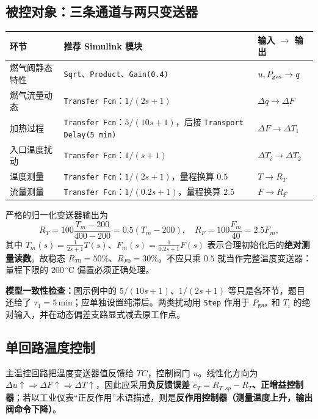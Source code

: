 \documentclass[UTF8,a4paper,11pt]{ctexart}
\newcommand{\dev}{\Delta}
\newcommand{\unit}[1]{\,\mathrm{#1}}
\begin{document}
\subsection{被控对象：三条通道与两只变送器}
\begin{center}
\small
\begin{tabular}{p{.26\linewidth}p{.38\linewidth}p{.26\linewidth}}
\toprule
环节 & 推荐 Simulink 模块 & 输入 $\rightarrow$ 输出\\
\midrule
燃气阀静态特性 & \texttt{Sqrt}、\texttt{Product}、\texttt{Gain(0.4)} & $u,P_{\rm gas}\rightarrow q$\\
燃气流量动态 & \texttt{Transfer Fcn}：$1/(2s+1)$ & $\dev q\rightarrow\dev F$\\
加热过程 & \texttt{Transfer Fcn}：$5/(10s+1)$，后接 \texttt{Transport Delay(5 min)} & $\dev F\rightarrow\dev T_1$\\
入口温度扰动 & \texttt{Transfer Fcn}：$1/(s+1)$ & $\dev T_i\rightarrow\dev T_2$\\
温度测量 & \texttt{Transfer Fcn}：$1/(2s+1)$，量程换算 $0.5$ & $T\rightarrow R_T$\\
流量测量 & \texttt{Transfer Fcn}：$1/(0.2s+1)$，量程换算 $2.5$ & $F\rightarrow R_F$\\
\bottomrule
\end{tabular}
\end{center}
严格的归一化变送器输出为
\begin{equation}\label{eq:meas}
R_T=100\frac{T_m-200}{400-200}=0.5(T_m-200),\quad
R_F=100\frac{F_m}{40}=2.5F_m,
\end{equation}
其中 $T_m(s)=\frac{1}{2s+1}T(s)$、$F_m(s)=\frac{1}{0.2s+1}F(s)$ 表示合理初始化后的\textbf{绝对测量读数}。故稳态 $R_{T0}=50\%$、$R_{F0}=30\%$。不应只乘 $0.5$ 就当作完整温度变送器：量程下限的 $200\unit{^\circ C}$ 偏置必须正确处理。

\begin{notebox}
\textbf{模型一致性检查：}图示例中的 $5/(10s+1)$、$1/(2s+1)$ 等只是各环节，题目还给了 $\tau_1=5\unit{min}$；应单独设置纯滞后。两类扰动用 \texttt{Step} 作用于 $P_{\rm gas}$ 和 $T_i$ 的绝对输入，并在动态偏差支路显式减去原工作点。
\end{notebox}

\subsection{单回路温度控制}
主温控回路把温度变送器值反馈给 $TC$，控制阀门 $u$。线性化方向为 $\dev u\uparrow\Rightarrow\dev F\uparrow\Rightarrow\dev T\uparrow$，因此应采用\textbf{负反馈误差 $e_T=R_{T,sp}-R_T$、正增益控制器}；若以工业仪表“正反作用”术语描述，则是\textbf{反作用控制器（测量温度上升，输出阀命令下降）}。
\end{document}
